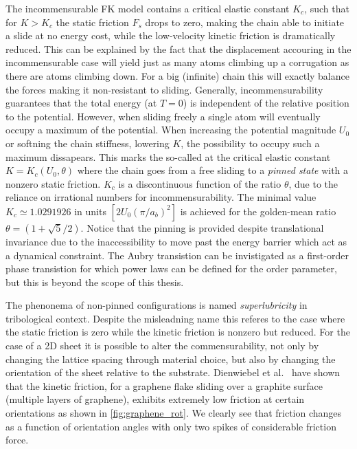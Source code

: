 
The incommensurable FK model contains a critical elastic constant $K_c$, such
that for $K > K_c$ the static friction $F_s$ drops to zero, making the chain able to initiate a slide at no energy cost, while the low-velocity kinetic friction is dramatically reduced. This can be explained by the
fact that the displacement accouring in the incommensurable case will yield just
as many atoms climbing up a corrugation as there are atoms climbing down. For a big (infinite) chain this will exactly balance the forces making it
non-resistant to sliding. Generally, incommensurability guarantees that the
total energy (at $T=0$) is independent of the relative position to the
potential. However, when sliding freely a single atom will eventually occupy a
maximum of the potential. When increasing the potential magnitude $U_0$ or
softning the chain stiffness, lowering $K$, the possibility to occupy such a
maximum dissapears. This marks the so-called 
at the critical elastic constant $K = K_c(U_0, \theta)$ where the chain goes
from a free sliding to a \textit{pinned state} with a nonzero static friction.
$K_c$ is a discontinuous function of the ratio $\theta$, due to the reliance on
irrational numbers for incommensurability. The minimal
value $K_c \simeq 1.0291926 $ in units $[2 U_0 (\pi / a_b)^2]$ is achieved for
the golden-mean ratio $\theta = (1+\sqrt{5}/2)$. Notice that the pinning is
provided despite translational invariance due to the inaccessibility to move
past the energy barrier which act as a dynamical constraint. The Aubry transistion
can be invistigated as a first-order phase transistion for which power laws can be
defined for the order parameter, but this is beyond the scope of this thesis.

The phenonema of non-pinned configurations is named \textit{superlubricity} in
tribological context. Despite the misleadning name this referes to the case
where the static friction is zero while the kinetic friction is nonzero but
reduced. For the case of a 2D sheet it is possible to alter the commensurability, not only by changing the lattice spacing through material choice, but also
by changing the orientation of the sheet relative to the substrate. Dienwiebel et al.\ \cite{DIENWIEBEL2005197} have shown that the kinetic friction, for a graphene flake sliding over a graphite surface (multiple layers of graphene), exhibits extremely low friction at certain orientations as shown in \cref{fig:graphene_rot}. We clearly see that friction changes as a function of orientation angles with only two spikes of considerable friction force.


